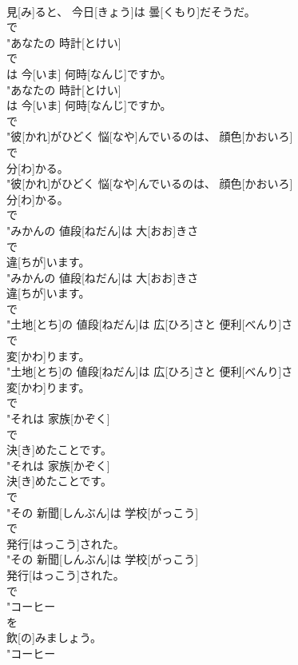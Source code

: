 \documentclass[8pt]{extreport}
\begin{document}
\begin{CJK}{UTF8}{min}
\\	見[み]ると、 今日[きょう]は 曇[くもり]だそうだ。
\\	で
\\	"あなたの 時計[とけい]
\\	で
\\	は 今[いま] 何時[なんじ]ですか。
\\	"あなたの 時計[とけい]
\\	は 今[いま] 何時[なんじ]ですか。
\\	で
\\	"彼[かれ]がひどく 悩[なや]んでいるのは、 顔色[かおいろ]
\\	で
\\	分[わ]かる。
\\	"彼[かれ]がひどく 悩[なや]んでいるのは、 顔色[かおいろ]
\\	分[わ]かる。
\\	で
\\	"みかんの 値段[ねだん]は 大[おお]きさ
\\	で
\\	違[ちが]います。
\\	"みかんの 値段[ねだん]は 大[おお]きさ
\\	違[ちが]います。
\\	で
\\	"土地[とち]の 値段[ねだん]は 広[ひろ]さと 便利[べんり]さ
\\	で
\\	変[かわ]ります。
\\	"土地[とち]の 値段[ねだん]は 広[ひろ]さと 便利[べんり]さ
\\	変[かわ]ります。
\\	で
\\	"それは 家族[かぞく]
\\	で
\\	決[き]めたことです。
\\	"それは 家族[かぞく]
\\	決[き]めたことです。
\\	で
\\	"その 新聞[しんぶん]は 学校[がっこう]
\\	で
\\	発行[はっこう]された。
\\	"その 新聞[しんぶん]は 学校[がっこう]
\\	発行[はっこう]された。
\\	で
\\	"コーヒー
\\	を
\\	飲[の]みましょう。
\\	"コーヒー

\end{CJK}
\end{document}
